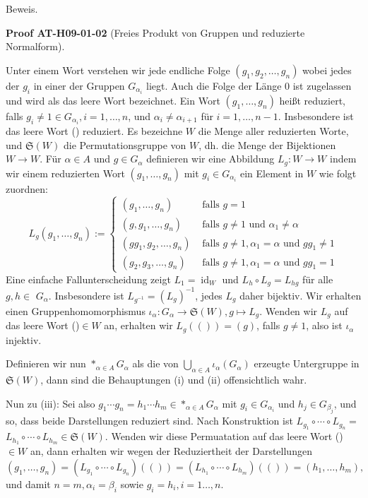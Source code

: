 \documentclass[10pt, letterpaper]{article}
\newcommand{\CustomHeading}[3]{%
  \par\medskip\noindent%
  \textbf{#1 #2} \textnormal{(#3)}.\enskip%
}
\newenvironment{PROOF}[2]{\begin{unitbox}\CustomHeading{Proof}{#1}{#2}}{\end{unitbox}}
\begin{document}
Beweis. 

\begin{PROOF}{AT-H09-01-02}{Freies Produkt von Gruppen und reduzierte Normalform}
Unter einem Wort verstehen wir jede endliche Folge $\left(g_1, g_2, \ldots, g_n\right)$ wobei jedes der $g_i$ in einer der Gruppen $G_{\alpha_i}$ liegt. Auch die Folge der Länge 0 ist zugelassen und wird als das leere Wort bezeichnet. Ein Wort $\left(g_1, \ldots, g_n\right)$ heißt reduziert, falls $g_i \neq 1 \in G_{\alpha_i}, i=1, \ldots, n$, und $\alpha_i \neq \alpha_{i+1}$ für $i=1, \ldots, n-1$. Insbesondere ist das leere Wort () reduziert. Es bezeichne $W$ die Menge aller reduzierten Worte, und $\mathfrak{S}(W)$ die Permutationsgruppe von $W$, dh. die Menge der Bijektionen $W \rightarrow W$. Für $\alpha \in A$ und $g \in G_\alpha$ definieren wir eine Abbildung $L_g: W \rightarrow W$ indem wir einem reduzierten Wort $\left(g_1, \ldots, g_n\right)$ mit $g_i \in G_{\alpha_i}$ ein Element in $W$ wie folgt zuordnen:
$$
L_g\left(g_1, \ldots, g_n\right):= \begin{cases}\left(g_1, \ldots, g_n\right) & \text { falls } g=1 \\ \left(g, g_1, \ldots, g_n\right) & \text { falls } g \neq 1 \text { und } \alpha_1 \neq \alpha \\ \left(g g_1, g_2, \ldots, g_n\right) & \text { falls } g \neq 1, \alpha_1=\alpha \text { und } g g_1 \neq 1 \\ \left(g_2, g_3, \ldots, g_n\right) & \text { falls } g \neq 1, \alpha_1=\alpha \text { und } g g_1=1\end{cases}
$$
Eine einfache Fallunterscheidung zeigt $L_1=\operatorname{id}_W$ und $L_h \circ L_g=L_{h g}$ für alle $g, h \in$ $G_\alpha$. Insbesondere ist $L_{g^{-1}}=\left(L_g\right)^{-1}$, jedes $L_g$ daher bijektiv. Wir erhalten einen Gruppenhomomorphismus $\iota_\alpha: G_\alpha \rightarrow \mathfrak{S}(W), g \mapsto L_g$. Wenden wir $L_g$ auf das leere Wort ()$\in W$ an, erhalten wir $L_g(())=(g)$, falls $g \neq 1$, also ist $\iota_\alpha$ injektiv. 

Definieren wir nun $*_{\alpha \in A} G_\alpha$ als die von $\bigcup_{\alpha \in A} \iota_\alpha\left(G_\alpha\right)$ erzeugte Untergruppe in $\mathfrak{S}(W)$, dann sind die Behauptungen (i) und (ii) offensichtlich wahr. 

Nun zu (iii): Sei also $g_1 \cdots g_n=h_1 \cdots h_m \in *_{\alpha \in A} G_\alpha$ mit $g_i \in G_{\alpha_i}$ und $h_j \in G_{\beta_j}$, und so, dass beide Darstellungen reduziert sind. Nach Konstruktion ist $L_{g_1} \circ \cdots \circ L_{g_n}=$ $L_{h_1} \circ \cdots \circ L_{h_m} \in \mathfrak{S}(W)$. Wenden wir diese Permuatation auf das leere Wort () $\in W$ an, dann erhalten wir wegen der Reduziertheit der Darstellungen
$$
\left(g_1, \ldots, g_n\right)=\left(L_{g_1} \circ \cdots \circ L_{g_n}\right)(())=\left(L_{h_1} \circ \cdots \circ L_{h_m}\right)(())=\left(h_1, \ldots, h_m\right),
$$
und damit $n=m, \alpha_i=\beta_i$ sowie $g_i=h_i, i=1 \ldots, n$. 


\end{PROOF}
\end{document}
